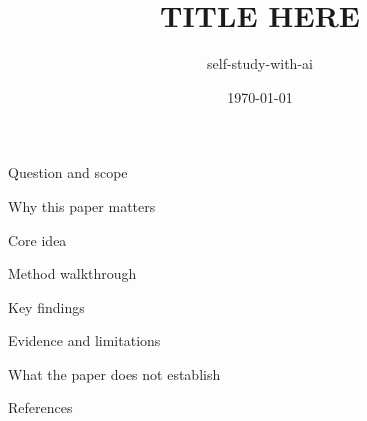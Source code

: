 \documentclass[aspectratio=169,11pt]{beamer}
\title{TITLE HERE}
\author{self-study-with-ai}
\date{\today}
\begin{document}
\begin{frame}
  \titlepage
\end{frame}

\begin{frame}{Question and scope}
\end{frame}

\begin{frame}{Why this paper matters}
\end{frame}

\begin{frame}{Core idea}
\end{frame}

\begin{frame}{Method walkthrough}
\end{frame}

\begin{frame}{Key findings}
\end{frame}

\begin{frame}{Evidence and limitations}
\end{frame}

\begin{frame}{What the paper does not establish}
\end{frame}

\begin{frame}{References}
  \footnotesize
  
  
\end{frame}
\end{document}
